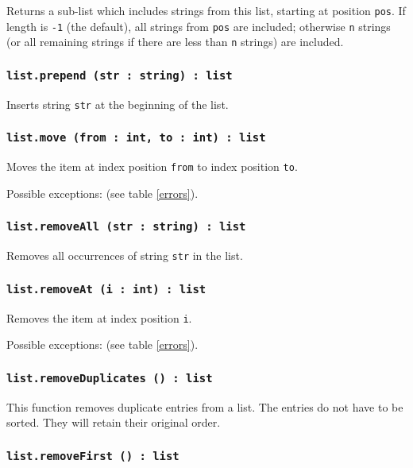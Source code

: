 Returns a sub-list which includes strings from this list, starting at position \texttt{pos}. If length is \texttt{-1} (the default), all strings from \texttt{pos} are included; otherwise \texttt{n} strings (or all remaining strings if there are less than \texttt{n} strings) are included.

\subsubsection{\texttt{list.prepend (str : string) : list}}

Inserts string \texttt{str} at the beginning of the list.

\subsubsection{\texttt{list.move (from : int, to : int) : list}}

Moves the item at index position \texttt{from} to index position \texttt{to}.

Possible exceptions:  (see table \ref{errors}).

\subsubsection{\texttt{list.removeAll (str : string) : list}}

Removes all occurrences of string \texttt{str} in the list.

\subsubsection{\texttt{list.removeAt (i : int) : list}}

Removes the item at index position \texttt{i}.

Possible exceptions:  (see table \ref{errors}).

\subsubsection{\texttt{list.removeDuplicates () : list}}

This function removes duplicate entries from a list. The entries do not have to be sorted. They will retain their original order.

\subsubsection{\texttt{list.removeFirst () : list}}

